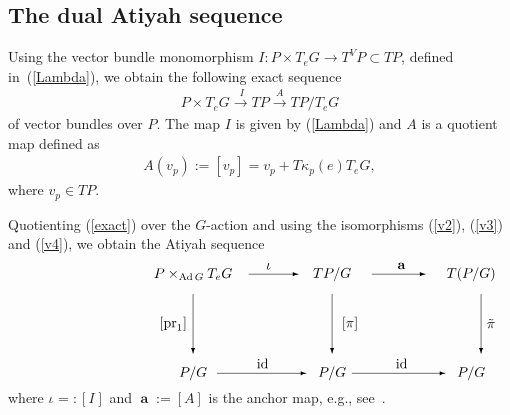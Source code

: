 \documentclass[pdftex]{sigma}
\renewcommand{\to}{\rightarrow}
\DeclareMathOperator{\Ad}{Ad}
\DeclareMathOperator{\anch}{\mathbf{a}}
\newcommand{\id}{\text{\upshape id}}
\numberwithin{equation}{section}
\begin{document}
\subsection{The dual Atiyah sequence}
Using the vector bundle monomorphism $I\colon P\times T_eG\to T^V P\subset TP$, def\/ined in~(\ref{Lambda}), we obtain the following exact sequence
\begin{gather}\label{exact}
 P\times T_eG\stackrel{\ I}{\longrightarrow} TP\stackrel{A }{\longrightarrow} TP/T_eG\end{gather}
of vector bundles over $P$. The map $I$ is given by (\ref{Lambda}) and $A$ is a quotient map def\/ined as{\samepage
\begin{gather*}%
A(v_p):=[v_p]=v_p+T\kappa_p(e)T_eG,\end{gather*}
where $v_p\in TP$.}

Quotienting (\ref{exact}) over the $G$-action and using the isomorphisms
(\ref{v2}), (\ref{v3}) and (\ref{v4}), we obtain the Atiyah sequence
\begin{gather}\label{Aseq}\begin{split}& \unitlength=5mm
\begin{picture}(11,5.6)(-4.5,0)
 \put(-2,5){\makebox(0,0){$P\times_{\Ad G}T_eG$}}
 \put(5,5){\makebox(0,0){$ TP/G$}}
 \put(12,5){\makebox(0,0){$T(P/G)$}}
 \put(-2,0){\makebox(0,0){$P/G$}}
 \put(5,0){\makebox(0,0){$P/G$}}
 \put(12,0){\makebox(0,0){$P/G$}}
 \put(5,4){\vector(0,-1){3}}
 \put(-2,4){\vector(0,-1){3}}
 \put(12.5,4){\vector(0,-1){3}}
 \put(7,5){\vector(1,0){2.7}}
 \put(6,0){\vector(1,0){4.7}}
 \put(-0.8,0){\vector(1,0){4.5}}
 \put(0.8,5){\vector(1,0){2.5}}
 \put(-1.5,2.5){\makebox(0,0){$\ $}}
\put(-3,2.5){\makebox(0,0){$[\operatorname{pr}_1]$}}
\put(13,2.5){\makebox(0,0){$\tilde\pi$}}
 \put(5.9,2.5){\makebox(0,0){$[\pi]$}}
 \put(12.5,2.5){\makebox(0,0){$\ $}}
 \put(8.5,5.4){\makebox(0,0){$\anch $}}
 \put(8.5,0.5){\makebox(0,0){$\id$}}
\put(1.5,0.5){\makebox(0,0){$ \id $}}
\put(1.8,5.4){\makebox(0,0){$\iota $}}
 \end{picture}\end{split}\end{gather}
where $\iota_{}=:[I_{}]$ and $\anch:=[A]$ is the anchor map, e.g., see~\cite{Mackenzie:GT}.
\end{document}
